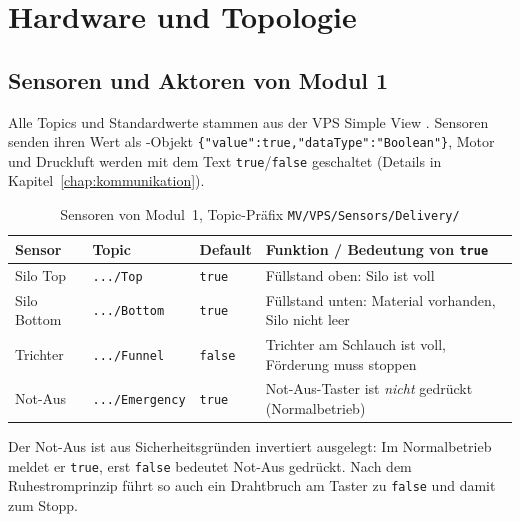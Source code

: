 \chapter{Hardware und Topologie}
\label{chap:hardware}


\section{Sensoren und Aktoren von Modul 1}
\label{sec:sensoren-aktoren}

Alle Topics und Standardwerte stammen aus der VPS Simple View
\cite{vps-simple-view}. Sensoren senden ihren Wert als -Objekt
\texttt{\{"value":true,"dataType":"Boolean"\}}, Motor und Druckluft werden mit dem Text
\texttt{true}/\texttt{false} geschaltet (Details in Kapitel~\ref{chap:kommunikation}).

\begin{table}[htbp]
  \centering
  \footnotesize
  \begin{tabularx}{\textwidth}{@{}l l l X@{}}
    \toprule
    \textbf{Sensor} & \textbf{Topic} & \textbf{Default} & \textbf{Funktion / Bedeutung von \texttt{true}} \\
    \midrule
    Silo Top     & \texttt{.../Top}       & \texttt{true}  & Füllstand oben: Silo ist voll \\
    Silo Bottom  & \texttt{.../Bottom}    & \texttt{true}  & Füllstand unten: Material vorhanden, Silo nicht leer \\
    Trichter     & \texttt{.../Funnel}    & \texttt{false} & Trichter am Schlauch ist voll, Förderung muss stoppen \\
    Not-Aus      & \texttt{.../Emergency} & \texttt{true}  & Not-Aus-Taster ist \emph{nicht} gedrückt (Normalbetrieb) \\
    \bottomrule
  \end{tabularx}
  \caption[Sensoren von Modul~1]{Sensoren von Modul~1, Topic-Präfix \texttt{MV/VPS/Sensors/Delivery/}}
  \label{tab:sensoren}
\end{table}

Der Not-Aus ist aus Sicherheitsgründen invertiert ausgelegt: Im Normalbetrieb
meldet er \texttt{true}, erst \texttt{false} bedeutet \glqq Not-Aus gedrückt\grqq.
Nach dem Ruhestromprinzip führt so auch ein Drahtbruch am Taster zu \texttt{false}
und damit zum Stopp.

